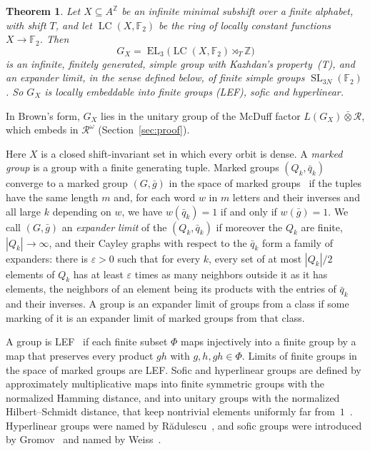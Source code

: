 \documentclass[11pt]{amsart}
\newtheorem{theorem}{Theorem}
\newcommand{\F}{\mathbb F}
\newcommand{\Z}{\mathbb Z}
\newcommand{\LC}{\operatorname{LC}}
\newcommand{\EL}{\operatorname{EL}}
\newcommand{\SL}{\operatorname{SL}}
\begin{document}
\begin{theorem}\label{thm:main}
Let $X\subseteq A^{\Z}$ be an infinite minimal subshift over a finite
alphabet, with shift $T$, and let $\LC(X,\F_2)$ be the ring of locally
constant functions $X\to\F_2$. Then
\[
  G_X=\EL_3\bigl(\LC(X,\F_2)\rtimes_T\Z\bigr)
\]
is an infinite, finitely generated, simple group with Kazhdan's
property~\textup{(T)}, and an expander limit, in the sense defined below,
of finite simple groups $\SL_{3N}(\F_2)$. So $G_X$ is locally embeddable
into finite groups \textup{(LEF)}, sofic and hyperlinear.
\end{theorem}

In Brown's form, $G_X$ lies in the unitary group of the McDuff factor
$L(G_X)\mathbin{\bar\otimes}\mathcal R$, which embeds in $\mathcal R^\omega$
(Section~\ref{sec:proof}).

Here $X$ is a closed shift-invariant set in which every orbit is dense. A
\emph{marked group} is a group with a finite generating tuple. Marked
groups $(Q_k,\bar q_k)$ converge to a marked group $(G,\bar g)$ in the
space of marked groups~\cite{Grigorchuk,Champetier} if the tuples have the
same length $m$ and, for each word $w$ in $m$ letters and their inverses
and all large $k$ depending on $w$, we have $w(\bar q_k)=1$ if and only if
$w(\bar g)=1$. We call $(G,\bar g)$ an \emph{expander limit} of the
$(Q_k,\bar q_k)$ if moreover the $Q_k$ are finite, $|Q_k|\to\infty$, and
their Cayley graphs with respect to the $\bar q_k$ form a family of
expanders: there is $\varepsilon>0$ such that for every $k$, every set of
at most $|Q_k|/2$ elements of $Q_k$ has at least $\varepsilon$ times as
many neighbors outside it as it has elements, the neighbors of an element
being its products with the entries of $\bar q_k$ and their inverses. A
group is an expander limit of groups from a class if some marking of it is
an expander limit of marked groups from that class.

A group is LEF~\cite{VershikGordon} if each finite subset $\Phi$ maps
injectively into a finite group by a map that preserves every product $gh$
with $g,h,gh\in\Phi$. Limits of finite groups in the space of marked groups
are LEF. Sofic and hyperlinear groups are defined by approximately
multiplicative maps into finite symmetric groups with the normalized
Hamming distance, and into unitary groups with the normalized
Hilbert--Schmidt distance, that keep nontrivial elements uniformly far
from~$1$~\cite{Pestov}. Hyperlinear groups were named by
R\u{a}dulescu~\cite{Radulescu}, and sofic groups were introduced by
Gromov~\cite{Gromov99} and named by Weiss~\cite{Weiss}.
\end{document}
